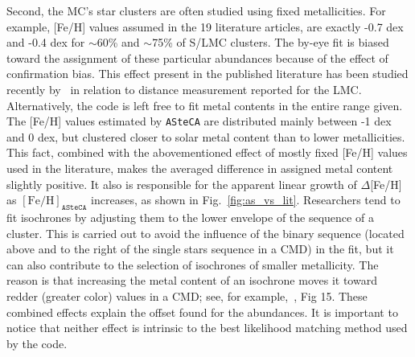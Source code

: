 \documentclass{aa}
\begin{document}
\noindent Second, the MC's star clusters are often studied
using fixed metallicities. For example, [Fe/H] values assumed in the 19
literature articles, are exactly -0.7 dex and -0.4 dex for $\sim$60\% and
$\sim$75\% of S/LMC clusters. The by-eye fit is biased toward the
assignment of these particular abundances because of the effect
of confirmation bias. This effect present in the published
literature has been studied recently by~\cite{de_Grijs_2014} in relation to
distance measurement reported for the LMC.\@
Alternatively, the code is left free to fit metal contents in the
entire range given. The [Fe/H] values estimated by \texttt{ASteCA} are
distributed mainly between -1 dex and 0 dex, but clustered closer to solar
metal content than to lower metallicities. This fact, combined with the
abovementioned effect of mostly fixed [Fe/H] values used in the literature,
makes the averaged difference in assigned metal content slightly positive.
It also is responsible for the apparent linear growth of $\Delta$[Fe/H] as
$\mathrm{[Fe/H]}_{\mathtt{ASteCA}}$ increases, as shown in Fig.~\ref{fig:as_vs_lit}.
%
Researchers tend to fit isochrones by adjusting them to the lower envelope of
the sequence of a cluster. This is carried out to avoid the influence of the
binary sequence (located above and to the right of the single stars sequence in
a CMD) in the fit, but it can also contribute to the selection of
isochrones of smaller metallicity. The reason is that increasing the
metal content of an isochrone moves it toward redder (greater color) values in a
CMD; see, for example,~\cite{Bressan_2012}, Fig 15.
%
These combined effects explain the offset found for the abundances. It is
important to notice that neither effect is intrinsic to the best likelihood
matching method used by the code.
\end{document}
